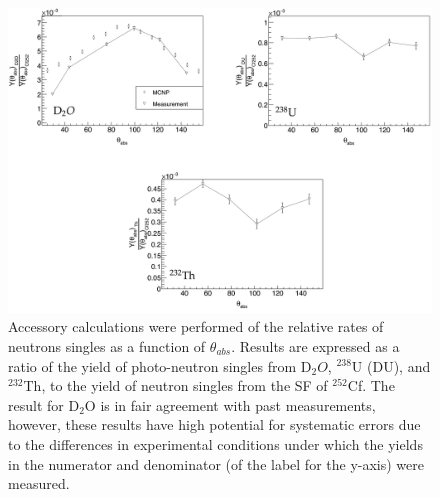 \begin{figure}
    \includegraphics[width = 1\textwidth]{Content/Results/Singles.png}
    \caption{Accessory calculations were performed of the relative rates of neutrons singles as a function of $\theta_{abs}$. 
    Results are expressed as a ratio of the yield of photo-neutron singles from D$_{2}O$, $^{238}$U (DU), and $^{232}$Th, to the yield of neutron singles from the SF of $^{252}$Cf.
   The result for D$_{2}$O is in fair agreement with past measurements, however, these results have high potential for systematic errors due to the differences in experimental conditions under which the yields in the numerator and denominator (of the label for the y-axis) were measured.
       }
    \label{fig:Singles}
\end{figure}
\FloatBarrier